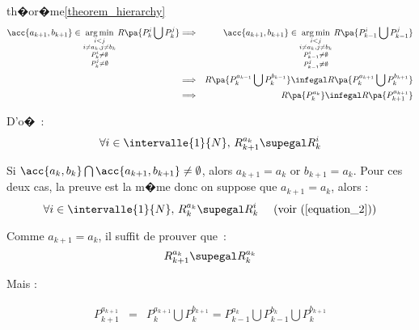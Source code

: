 \begin{xdemo}{th�or�me}{\ref{theorem_hierarchy}}
    \begin{eqnarray*}
    \acc{a_{k+1},b_{k+1}} \in \underset{  \begin{subarray}{c} i < j \\ i \neq a_k, j\neq b_k\\
        P_{k}^i \neq \emptyset \\ P_{k}^j \neq \emptyset\end{subarray} }
        {\arg \min} \, R\pa{P_{k}^i \bigcup P_{k}^j}   
    &\Longrightarrow& \acc{a_{k+1},b_{k+1}} \in \underset{  \begin{subarray}{c} i < j \\ i \neq a_k, j\neq b_k\\
        P_{k-1}^i \neq \emptyset \\ P_{k-1}^j \neq \emptyset\end{subarray} }
        {\arg \min} \, R\pa{P_{k-1}^i \bigcup P_{k-1}^j}\\
    &\Longrightarrow& R\pa{P_k^{a_{k-1}} \bigcup P_k^{b_{k-1}}}   \infegal R\pa{P_k^{a_{k+1}} \bigcup P_k^{b_{k+1}}} \\
    &\Longrightarrow& R\pa{ P_k^{a_{k}} }   \infegal R\pa{ P_{k+1}^{a_{k+1}} }
    \end{eqnarray*}

D'o�~:
    \begin{eqnarray}
    \forall i \in \intervalle{1}{N}, \, R_{k+1}^{a_k} \supegal R_{k}^{i} \label{equation_reca_1}
    \end{eqnarray}




\itemdemo
\quad 
{} 

Si $\acc{a_k,b_k} \bigcap \acc{a_{k+1},b_{k+1}} \neq \emptyset$, alors $a_{k+1} = a_k$ or $b_{k+1} = a_k$. Pour ces deux cas, la preuve est la m�me donc on suppose que $a_{k+1} = a_k$, alors :
    $$
    \forall i \in \intervalle{1}{N}, \, R_k^{a_k} \supegal R_{k}^{i} \quad \text{ (voir (\ref{equation_2}))}
    $$

Comme $a_{k+1} = a_k$, il suffit de prouver que~:
    $$
    R_{k+1}^{a_{k}} \supegal R_{k}^{a_{k}}
    $$

Mais :

    \begin{eqnarray*}
    P_{k+1}^{a_{k+1}}   &=&     P_{k}^{a_{k+1}} \bigcup P_{k}^{b_{k+1}}
                        =     P_{k-1}^{a_{k}} \bigcup P_{k-1}^{b_{k}} \bigcup P_{k}^{b_{k+1}}
    \end{eqnarray*}


\end{xdemo}
